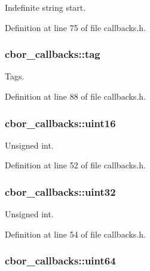 Indefinite string start. 



Definition at line 75 of file callbacks.\-h.

\hypertarget{structcbor__callbacks_ab5a727d5b11a7f2558cf811908f92e70}{
\subsubsection[{tag}]{ cbor\-\_\-callbacks\-::tag}}\label{structcbor__callbacks_ab5a727d5b11a7f2558cf811908f92e70}


Tags. 



Definition at line 88 of file callbacks.\-h.

\hypertarget{structcbor__callbacks_a3eb2039fa03bd534d6be0ed10d0c98be}{
\subsubsection[{uint16}]{ cbor\-\_\-callbacks\-::uint16}}\label{structcbor__callbacks_a3eb2039fa03bd534d6be0ed10d0c98be}


Unsigned int. 



Definition at line 52 of file callbacks.\-h.

\hypertarget{structcbor__callbacks_af2501b53c0150c4d3244a039b3232bf1}{
\subsubsection[{uint32}]{ cbor\-\_\-callbacks\-::uint32}}\label{structcbor__callbacks_af2501b53c0150c4d3244a039b3232bf1}


Unsigned int. 



Definition at line 54 of file callbacks.\-h.

\hypertarget{structcbor__callbacks_a2b0328261726fba55f663f55f954d56b}{
\subsubsection[{uint64}]{ cbor\-\_\-callbacks\-::uint64}}\label{structcbor__callbacks_a2b0328261726fba55f663f55f954d56b}


